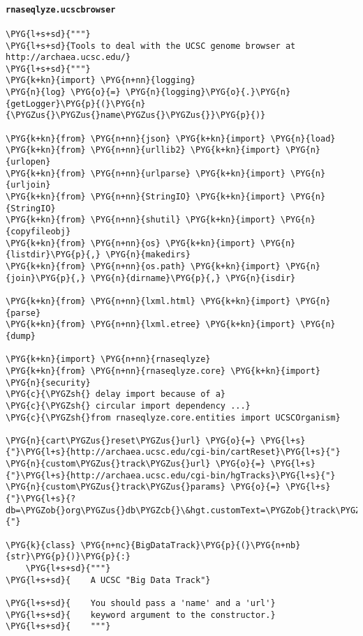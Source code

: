 \paragraph{\texttt{rnaseqlyze.ucscbrowser}}
\label{index-pdf4:rnaseqlyze-ucscbrowser}
\begin{Verbatim}[commandchars=\\\{\}]
\PYG{l+s+sd}{"""}
\PYG{l+s+sd}{Tools to deal with the UCSC genome browser at http://archaea.ucsc.edu/}
\PYG{l+s+sd}{"""}
\PYG{k+kn}{import} \PYG{n+nn}{logging}
\PYG{n}{log} \PYG{o}{=} \PYG{n}{logging}\PYG{o}{.}\PYG{n}{getLogger}\PYG{p}{(}\PYG{n}{\PYGZus{}\PYGZus{}name\PYGZus{}\PYGZus{}}\PYG{p}{)}

\PYG{k+kn}{from} \PYG{n+nn}{json} \PYG{k+kn}{import} \PYG{n}{load}
\PYG{k+kn}{from} \PYG{n+nn}{urllib2} \PYG{k+kn}{import} \PYG{n}{urlopen}
\PYG{k+kn}{from} \PYG{n+nn}{urlparse} \PYG{k+kn}{import} \PYG{n}{urljoin}
\PYG{k+kn}{from} \PYG{n+nn}{StringIO} \PYG{k+kn}{import} \PYG{n}{StringIO}
\PYG{k+kn}{from} \PYG{n+nn}{shutil} \PYG{k+kn}{import} \PYG{n}{copyfileobj}
\PYG{k+kn}{from} \PYG{n+nn}{os} \PYG{k+kn}{import} \PYG{n}{listdir}\PYG{p}{,} \PYG{n}{makedirs}
\PYG{k+kn}{from} \PYG{n+nn}{os.path} \PYG{k+kn}{import} \PYG{n}{join}\PYG{p}{,} \PYG{n}{dirname}\PYG{p}{,} \PYG{n}{isdir}

\PYG{k+kn}{from} \PYG{n+nn}{lxml.html} \PYG{k+kn}{import} \PYG{n}{parse}
\PYG{k+kn}{from} \PYG{n+nn}{lxml.etree} \PYG{k+kn}{import} \PYG{n}{dump}

\PYG{k+kn}{import} \PYG{n+nn}{rnaseqlyze}
\PYG{k+kn}{from} \PYG{n+nn}{rnaseqlyze.core} \PYG{k+kn}{import} \PYG{n}{security}
\PYG{c}{\PYGZsh{} delay import because of a}
\PYG{c}{\PYGZsh{} circular import dependency ...}
\PYG{c}{\PYGZsh{}from rnaseqlyze.core.entities import UCSCOrganism}

\PYG{n}{cart\PYGZus{}reset\PYGZus{}url} \PYG{o}{=} \PYG{l+s}{"}\PYG{l+s}{http://archaea.ucsc.edu/cgi-bin/cartReset}\PYG{l+s}{"}
\PYG{n}{custom\PYGZus{}track\PYGZus{}url} \PYG{o}{=} \PYG{l+s}{"}\PYG{l+s}{http://archaea.ucsc.edu/cgi-bin/hgTracks}\PYG{l+s}{"}
\PYG{n}{custom\PYGZus{}track\PYGZus{}params} \PYG{o}{=} \PYG{l+s}{"}\PYG{l+s}{?db=\PYGZob{}org\PYGZus{}db\PYGZcb{}\&hgt.customText=\PYGZob{}track\PYGZus{}url\PYGZcb{}}\PYG{l+s}{"}

\PYG{k}{class} \PYG{n+nc}{BigDataTrack}\PYG{p}{(}\PYG{n+nb}{str}\PYG{p}{)}\PYG{p}{:}
    \PYG{l+s+sd}{"""}
\PYG{l+s+sd}{    A UCSC "Big Data Track"}

\PYG{l+s+sd}{    You should pass a 'name' and a 'url'}
\PYG{l+s+sd}{    keyword argument to the constructor.}
\PYG{l+s+sd}{    """}


\end{Verbatim}
